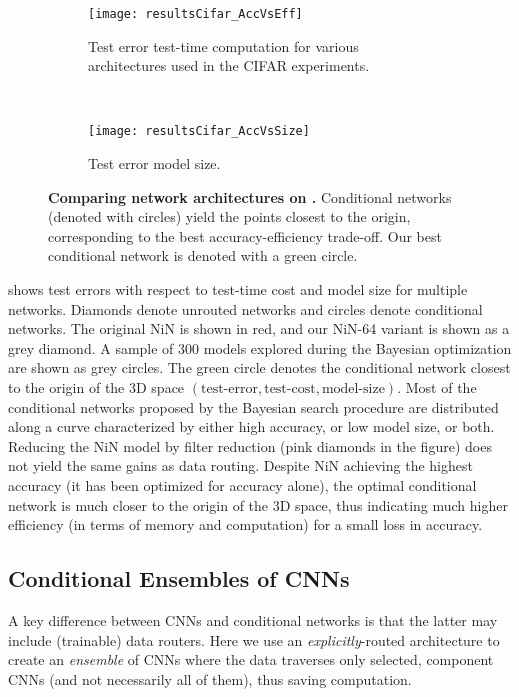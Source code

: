 \documentclass[thesis]{subfiles}
\begin{document}
	\begin{figure}[tbp] 
		\centering
		\begin{subfigure}[b]{0.8\linewidth}
			\centering
			\texttt{[image: resultsCifar\_AccVsEff]}
			\caption{Test error \vs test-time computation for various architectures used in the CIFAR experiments.}\label{fig:resultsCifar_AccVsEff}
		\end{subfigure}
		~
		\begin{subfigure}[b]{0.8\linewidth}
			\centering
			\texttt{[image: resultsCifar\_AccVsSize]}
			\caption{Test error \vs model size.}\label{fig:resultsCifar_AccVsSize}
		\end{subfigure}
		\caption[Comparing network architectures on ]{\textbf{Comparing network architectures on .} Conditional networks (denoted with circles) yield the points closest to the origin, corresponding to the best accuracy-efficiency trade-off. Our best conditional network is denoted with a green circle.}\label{fig:Cifar_results}
	\end{figure}
	 shows test errors with respect to test-time cost and model size for multiple networks.
	Diamonds denote unrouted networks and circles denote conditional networks. 
	The original NiN is shown in red, and our NiN-64 variant is shown as a grey diamond.
	A sample of 300 models explored during the Bayesian optimization are shown as grey circles.
	The green circle denotes the conditional network closest to the origin of the 
	3D space $(\textrm{test-error}, \textrm{test-cost}, \textrm{model-size})$.
	Most of the conditional networks proposed by the Bayesian search procedure are distributed along a curve characterized by either high accuracy, or low model size, or both. 
	Reducing the NiN model by filter reduction (pink diamonds in the figure) does not yield the same gains as data routing.
	Despite NiN achieving the highest accuracy (it has been optimized for accuracy alone), the optimal conditional network is much closer to the origin of the 3D space, thus indicating much higher efficiency (in terms of memory and computation) for a small loss in accuracy.

	\subsection{Conditional Ensembles of CNNs}
	A key difference between CNNs and conditional networks is that the latter may include (trainable) data routers. Here we use an {\em explicitly}-routed architecture to create an {\em ensemble} of CNNs where the data traverses only selected, component CNNs (and not necessarily all of them), thus saving computation.
\end{document}
